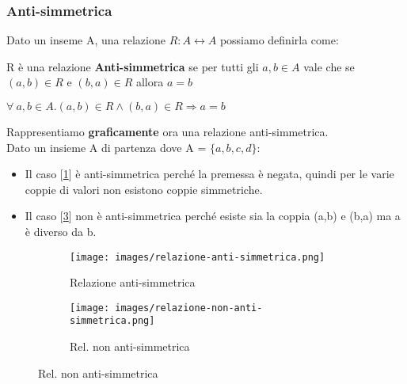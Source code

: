 \subsubsection{Anti-simmetrica}
Dato un inseme A, una relazione $R: A \longleftrightarrow A$ possiamo definirla come:
\begin{definition}
    R è una relazione \textbf{Anti-simmetrica} se per tutti gli $a,b \in A$ vale che se $(a, b) \in R$ e $(b, a) \in R$ allora $a = b$
    \begin{center}
        $\forall \: a,b \in A . (a, b) \in R \land (b, a) \in R \Longrightarrow a = b$
    \end{center}
\end{definition}
Rappresentiamo \textbf{graficamente} ora una relazione anti-simmetrica. \\Dato un insieme A di partenza dove A = $\{a, b, c, d\}$:
\begin{itemize}
    \item Il caso [\ref{fig:relazione-anti-simmetrica}] è anti-simmetrica perché la premessa è negata, quindi per le varie coppie di valori non esistono coppie simmetriche.
    \item Il caso [\ref{fig:relazione-non-anti-simmetrica}] non è anti-simmetrica perché esiste sia la coppia (a,b) e (b,a) ma a è diverso da b.
\end{itemize}
\begin{figure}[h!]
    \vspace{-10pt}
    \centering
    \begin{subfigure}{.3\textwidth}
        \centering
        \texttt{[image: images/relazione-anti-simmetrica.png]}
        \caption{Relazione anti-simmetrica}
        \label{fig:relazione-anti-simmetrica}
    \end{subfigure}
    \hspace{1.5cm}
    \begin{subfigure}{.3\textwidth}
        \centering
        \texttt{[image: images/relazione-non-anti-simmetrica.png]}
        \caption{Rel. non anti-simmetrica}
        \label{fig:relazione-non-anti-simmetrica}
    \end{subfigure}
\end{figure}
